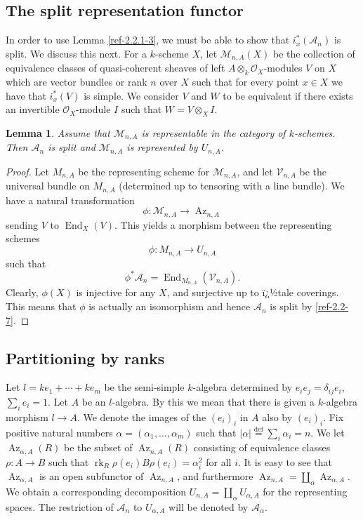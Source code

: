\documentclass{amsart}
\numberwithin{equation}{section}
\let\cal\mathcal
\newtheorem{lemmas}{Lemma}[subsection]
\theoremstyle{definition}
\theoremstyle{remark}
\begin{document}
\subsection{The split representation functor}
In order to use Lemma \ref{ref-2.2.1-3}, we must be able to show that $i_x^\ast({{\cal A}}_n)$
is split. We discuss this next. For a $k$-scheme $X$, let  ${{\cal M}}_{n,A}(X)$ be the collection
of equivalence classes of quasi-coherent sheaves of left $A\otimes_k {{\cal O}}_X$-modules $V$ on $X$ which are vector bundles or rank $n$
over $X$ such that for every point $x\in X$  we have that $i^\ast_x(V)$ is simple. We consider $V$ and $W$ to be equivalent if there exists an
invertible ${{\cal O}}_X$-module $I$ such that $W=V\otimes_X I$. 
\begin{lemmas}
\label{ref-2.3.1-5}
 Assume that ${{\cal M}}_{n,A}$  is representable in the category of
$k$-schemes. Then ${{\cal A}}_n$ is split and ${{\cal M}}_{n,A}$ is represented by $U_{n,A}$.
\end{lemmas}
\begin{proof} Let $M_{n,A}$ be the representing scheme for ${{\cal M}}_{n,A}$, and let ${{\cal V}}_{n,A}$ be the universal bundle
on $M_{n,A}$ (determined up to tensoring with a line bundle).
We have
a natural transformation 
\[
\phi:{{\cal M}}_{n,A}{\rightarrow} {\operatorname{Az}}_{n,A}
\]
sending $V$ to ${\operatorname {End}}_X(V)$. This yields a morphism between the representing
schemes
\begin{equation}
\label{ref-2.1-6}
\phi:M_{n,A}{\rightarrow} U_{n,A}
\end{equation}
such that 
\begin{equation}
\label{ref-2.2-7}
\phi^\ast{{\cal A}}_n={\operatorname {End}}_{M_{n,A}}({{\cal V}}_{n,A}).
\end{equation}
Clearly, $\phi(X)$ is injective for any $X$, and surjective up to ï¿½tale coverings.
This means that $\phi$ is actually an isomorphism and hence ${{\cal A}}_n$ is split
by \eqref{ref-2.2-7}.
\end{proof}
\subsection{Partitioning by ranks}
\label{ref-2.4-8}
 Let
$l=ke_1+\cdots+ke_m$ be the semi-simple $k$-algebra determined by
$e_ie_j=\delta_{ij}e_i$, $\sum_i e_i=1$. Let $A$ be an $l$-algebra.
By this we mean that there is given a $k$-algebra morphism $l{\rightarrow}
A$.  We denote the images of the $(e_i)_i$ in $A$ also by $(e_i)_i$. Fix
 positive natural numbers $\alpha=(\alpha_1,\ldots,\alpha_m)$
such that $|\alpha|\overset{\text{def}}{=}\sum_i\alpha_i=n$.
We let ${\operatorname{Az}}_{\alpha,A}(R)$ be the subset of ${\operatorname{Az}}_{n,A}(R)$ consisting of equivalence classes
$\rho:A{\rightarrow} B$ such that ${\operatorname {rk}}_{R} \rho(e_i)B\rho(e_i)=\alpha_i^2$ for all $i$.  It
is easy to see that ${\operatorname{Az}}_{\alpha,A}$ is an open subfunctor of
${\operatorname{Az}}_{n,A}$, and furthermore ${\operatorname{Az}}_{n,A}=\coprod_{\alpha} {\operatorname{Az}}_{\alpha,A}$.  We
obtain a corresponding decomposition $U_{n,A}=\coprod_{\alpha}
U_{\alpha,A}$ for the representing spaces. The restriction of
${{\cal A}}_n$ to $U_{\alpha,A}$ will be denoted by ${{\cal A}}_\alpha$.
\end{document}
